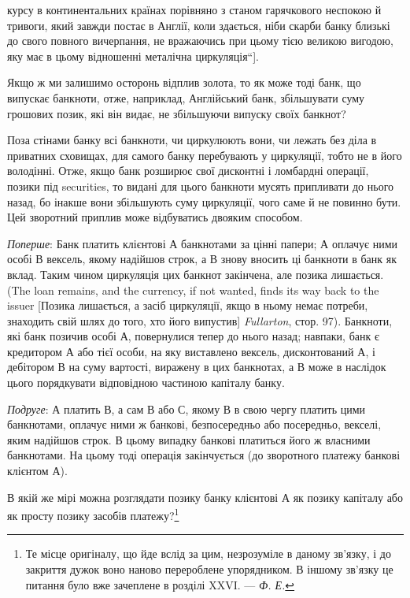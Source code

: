 \parcont{}  %
курсу в континентальних країнах порівняно з станом гарячкового
неспокою й тривоги, який завжди постає в Англії, коли
здається, ніби скарби банку близькі до свого повного вичерпання,
не вражаючись при цьому тією великою вигодою, яку
має в цьому відношенні металічна циркуляція“].

Якщо ж ми залишимо осторонь відплив золота, то як може
тоді банк, що випускає банкноти, отже, наприклад, Англійський
банк, збільшувати суму грошових позик, які він видає, не збільшуючи
випуску своїх банкнот?

Поза стінами банку всі банкноти, чи циркулюють вони, чи
лежать без діла в приватних сховищах, для самого банку перебувають
у циркуляції, тобто не в його володінні. Отже, якщо
банк розширює свої дисконтні і ломбардні операції, позики під
securities, то видані для цього банкноти мусять припливати до
нього назад, бо інакше вони збільшують суму циркуляції, чого
саме й не повинно бути. Цей зворотний приплив може відбуватись
двояким способом.

\emph{Поперше}: Банк платить клієнтові $А$ банкнотами за цінні папери;
$А$ оплачує ними особі $В$ вексель, якому надійшов строк,
а $В$ знову вносить ці банкноти в банк як вклад. Таким чином
циркуляція цих банкнот закінчена, але позика лишається. (The
loan remains, and the currency, if not wanted, finds its way back
to the issuer [Позика лишається, а засіб циркуляції, якщо в ньому
немає потреби, знаходить свій шлях до того, хто його випустив]
\emph{Fullarton}, стор. 97). Банкноти, які банк позичив особі $А$, повернулися
тепер до нього назад; навпаки, банк є кредитором $А$
або тієї особи, на яку виставлено вексель, дисконтований $А$,
і дебітором $В$ на суму вартості, виражену в цих банкнотах,
а $В$ може в наслідок цього порядкувати відповідною частиною
капіталу банку.

\emph{Подруге}: $А$ платить $В$, а сам $В$ або $С$, якому $В$ в свою чергу
платить цими банкнотами, оплачує ними ж банкові, безпосередньо
або посередньо, векселі, яким надійшов строк. В цьому
випадку банкові платиться його ж власними банкнотами. На
цьому тоді операція закінчується (до зворотного платежу банкові
клієнтом $А$).

В якій же мірі можна розглядати позику банку клієнтові $А$
як позику капіталу або як просту позику засобів платежу?\footnote{
Те місце оригіналу, що йде вслід за цим, незрозуміле в даному зв’язку,
і до закриття дужок воно наново перероблене упорядником. В іншому зв’язку
це питання було вже зачеплене в розділі XXVI. — \emph{Ф. Е.}
}

